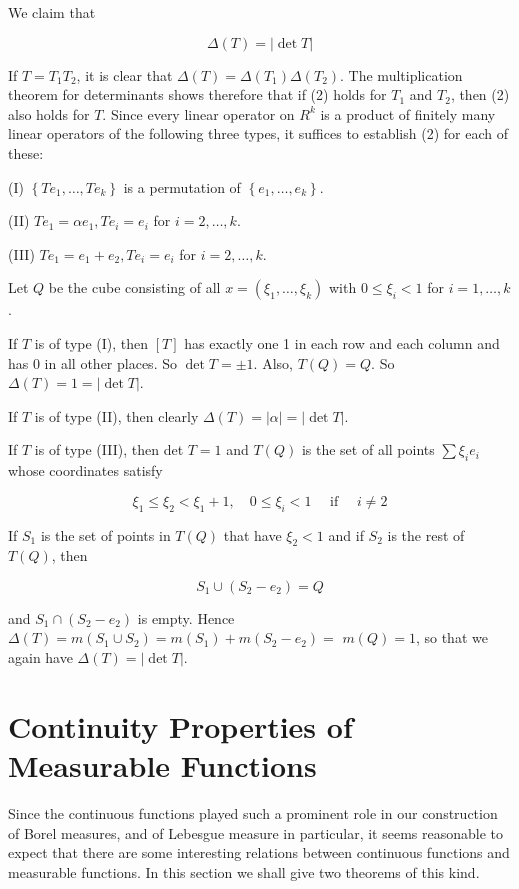 \documentclass[10pt]{article}
\begin{document}
We claim that

$$
\Delta(T)=|\operatorname{det} T|
$$

If $T=T_{1} T_{2}$, it is clear that $\Delta(T)=\Delta\left(T_{1}\right) \Delta\left(T_{2}\right)$. The multiplication theorem for determinants shows therefore that if (2) holds for $T_{1}$ and $T_{2}$, then (2) also holds for $T$. Since every linear operator on $R^{k}$ is a product of finitely many linear operators of the following three types, it suffices to establish (2) for each of these:

(I) $\left\{T e_{1}, \ldots, T e_{k}\right\}$ is a permutation of $\left\{e_{1}, \ldots, e_{k}\right\}$.

(II) $T e_{1}=\alpha e_{1}, T e_{i}=e_{i}$ for $i=2, \ldots, k$.

(III) $T e_{1}=e_{1}+e_{2}, T e_{i}=e_{i}$ for $i=2, \ldots, k$.

Let $Q$ be the cube consisting of all $x=\left(\xi_{1}, \ldots, \xi_{k}\right)$ with $0 \leq \xi_{i}<1$ for $i=1, \ldots, k$.

If $T$ is of type (I), then $[T]$ has exactly one 1 in each row and each column and has 0 in all other places. So $\operatorname{det} T= \pm 1$. Also, $T(Q)=Q$. So $\Delta(T)=1=|\operatorname{det} T|$.

If $T$ is of type (II), then clearly $\Delta(T)=|\alpha|=|\operatorname{det} T|$.

If $T$ is of type (III), then det $T=1$ and $T(Q)$ is the set of all points $\sum \xi_{i} e_{i}$ whose coordinates satisfy

$$
\xi_{1} \leq \xi_{2}<\xi_{1}+1, \quad 0 \leq \xi_{i}<1 \quad \text { if } \quad i \neq 2
$$

If $S_{1}$ is the set of points in $T(Q)$ that have $\xi_{2}<1$ and if $S_{2}$ is the rest of $T(Q)$, then

$$
S_{1} \cup\left(S_{2}-e_{2}\right)=Q
$$

and $S_{1} \cap\left(S_{2}-e_{2}\right)$ is empty. Hence $\Delta(T)=m\left(S_{1} \cup S_{2}\right)=m\left(S_{1}\right)+m\left(S_{2}-e_{2}\right)=$ $m(Q)=1$, so that we again have $\Delta(T)=|\operatorname{det} T|$.

\section{Continuity Properties of Measurable Functions}
Since the continuous functions played such a prominent role in our construction of Borel measures, and of Lebesgue measure in particular, it seems reasonable to expect that there are some interesting relations between continuous functions and measurable functions. In this section we shall give two theorems of this kind.
\end{document}
